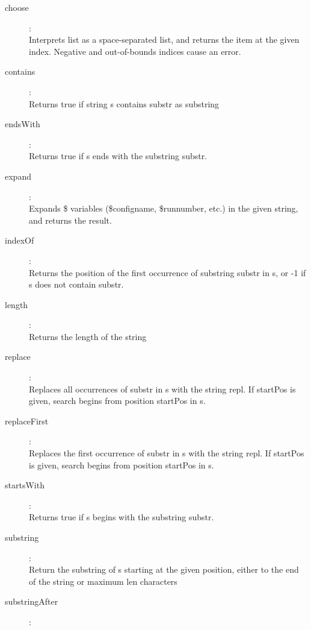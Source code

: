 \begin{description}
\item[choose]:  \\
    Interprets list as a space-separated list, and returns the item at the given index. Negative and out-of-bounds indices cause an error.
\item[contains]:  \\
    Returns true if string s contains substr as substring
\item[endsWith]:  \\
    Returns true if s ends with the substring substr.
\item[expand]:  \\
    Expands \${} variables (\${configname}, \${runnumber}, etc.) in the given string, and returns the result.
\item[indexOf]:  \\
    Returns the position of the first occurrence of substring substr in s, or -1 if s does not contain substr.
\item[length]:  \\
    Returns the length of the string
\item[replace]:  \\
    Replaces all occurrences of substr in s with the string repl. If startPos is given, search begins from position startPos in s.
\item[replaceFirst]:  \\
    Replaces the first occurrence of substr in s with the string repl. If startPos is given, search begins from position startPos in s.
\item[startsWith]:  \\
    Returns true if s begins with the substring substr.
\item[substring]:  \\
    Return the substring of s starting at the given position, either to the end of the string or maximum len characters
\item[substringAfter]:  \\

\end{description}
